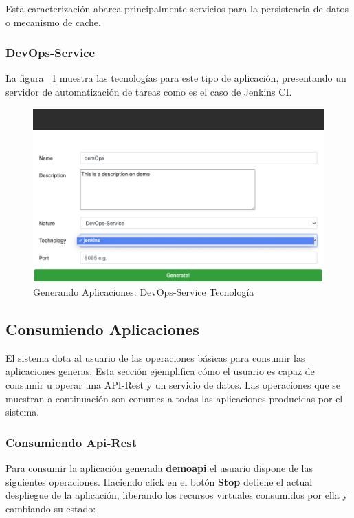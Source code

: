 \documentclass[a4paper,11pt]{book}
\begin{document}
Esta caracterización abarca principalmente servicios para la persistencia de datos o mecanismo de cache.

\subsubsection{DevOps-Service}

La figura ~\ref{21} muestra las tecnologías para este tipo de aplicación, presentando un servidor de automatización de tareas como es el caso de Jenkins CI. 


\begin{figure}[H]
\centering
\includegraphics[scale=0.4]{imagenes/casouso_a/21.png}
\caption{ Generando Aplicaciones: DevOps-Service Tecnología}
\label{21}
\end{figure}



\subsection{Consumiendo Aplicaciones}

El sistema dota al usuario de las operaciones básicas para consumir las aplicaciones generas. Esta sección ejemplifica cómo el usuario es capaz de consumir u operar una API-Rest y un servicio de datos. Las operaciones que se muestran a continuación son comunes a todas las aplicaciones producidas por el sistema. 

\subsubsection{Consumiendo Api-Rest}
Para consumir la aplicación generada \textbf{demoapi} el usuario dispone de las siguientes operaciones. Haciendo click en el botón \textbf{Stop} detiene el actual despliegue de la aplicación, liberando los recursos virtuales consumidos por ella y cambiando su estado:
\end{document}
